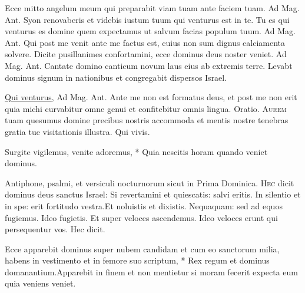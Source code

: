 \begin{multicols*}{2}
 Ecce mitto angelum meum qui preparabit viam tuam ante faciem tuam. {\color{Red} Ad Mag. Ant.} Syon renovaberis et videbis iustum tuum qui venturus est in te.
 Tu es qui venturus es domine quem expectamus ut salvum facias populum tuum. {\color{Red} Ad Mag. Ant.} Qui post me venit ante me factus est, cuius non sum dignus calciamenta solvere.
 Dicite pusillanimes confortamini, ecce dominus deus noster veniet. {\color{Red} Ad Mag. Ant.} Cantate domino canticum novum laus eius ab extremis terre.
 Levabt dominus signum in nationibus et congregabit dispersos Israel.
{\color{Red} }
\par {} \R \hyperlink{qui-venturus}{Qui venturus}, {\color{Red} Ad Mag. Ant.} Ante me non est formatus deus, et post me non erit quia michi curvabitur omne genui et confitebitur omnis lingua. {\color{Red} Oratio.}
\lettrine[lines=2]{\zallmancaps \color{Red} A}{urem} tuam quesumus domine precibus nostris accommoda et mentis nostre tenebras gratia tue visitationis illustra. Qui vivis.
\begin{invitatory}
{Surgite vigilemus, venite adoremus, * Quia nescitis horam quando veniet dominus.}
\end{invitatory}
Antiphone, psalmi, et versiculi nocturnorum sicut in Prima Dominica.
\lettrine[lines=2]{\zallmancaps \color{Blue} H}{ec} dicit dominus deus sanctus Israel: Si revertamini et quiescatis: salvi eritis. In silentio et in spe: erit fortitudo vestra.Et noluistis et dixistis. Nequaquam: sed ad equos fugiemus. Ideo fugietis. Et super veloces ascendemus. Ideo veloces erunt qui persequentur vos. Hec dicit.
\begin{responsory}
{Ecce apparebit dominus super nubem candidam et cum eo sanctorum milia, habens in vestimento et in femore suo scriptum, * Rex regum et dominus domanantium.}{Apparebit in finem et non mentietur si moram fecerit expecta eum quia veniens veniet.}
\end{responsory}

\end{multicols*}
